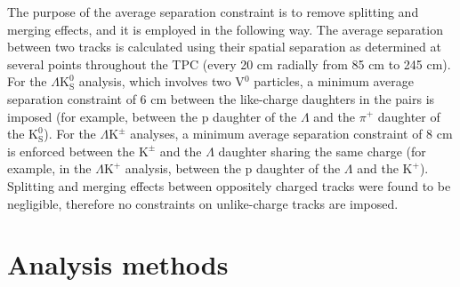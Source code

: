 \documentclass[ALICE,manyauthors]{cernphprep}
\newcommand{\Lam}{$\Lambda$\xspace}
\newcommand{\KchP}{$\mathrm{K^{+}}$\xspace}
\newcommand{\Kpm}{$\mathrm{K^{\pm}}$\xspace}
\newcommand{\Ks}{$\mathrm{K^{0}_{S}}$\xspace}
\newcommand{\LamKchP}{$\Lambda\mathrm{K^{+}}$\xspace}
\newcommand{\LamKpm}{$\Lambda\mathrm{K^{\pm}}$\xspace}
\newcommand{\LamKs}{$\Lambda\mathrm{K^{0}_{S}}$\xspace}
\newcommand{\Vz}{V$^{0}$\xspace}
\begin{document}
The purpose of the average separation constraint is to remove splitting and merging effects, and it is employed in the following way.  
The average separation between two tracks is calculated using their spatial separation as determined at several points throughout the TPC (every 20 cm radially from 85 cm to 245 cm).
For the \LamKs analysis, which involves two \Vz particles, a minimum average separation constraint of 6 cm between the like-charge daughters in the pairs is imposed (for example, between the p daughter of the \Lam and the $\pi^{+}$ daughter of the \Ks).
For the \LamKpm analyses, a minimum average separation constraint of 8 cm is enforced between the \Kpm and the \Lam daughter sharing the same charge (for example, in the \LamKchP analysis, between the p daughter of the \Lam and the \KchP).
Splitting and merging effects between oppositely charged tracks were found to be negligible, therefore no constraints on unlike-charge tracks are imposed.

\section{Analysis methods}
\label{sec:AnalysisMethods}

\end{document}
